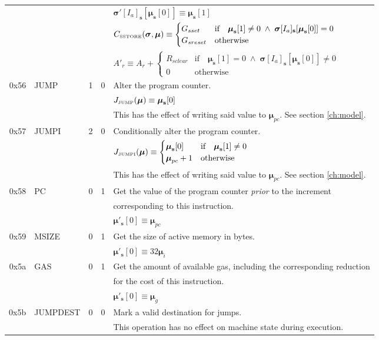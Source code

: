 \documentclass[9pt,oneside]{amsart}
\begin{document}
\begin{tabular*}{\columnwidth}[h]{rlrrl}
&&&& $\boldsymbol{\sigma}'[I_a]_\mathbf{s}[ \boldsymbol{\mu}_\mathbf{s}[0] ] \equiv \boldsymbol{\mu}_\mathbf{s}[1] $ \\
&&&& $C_{\text{\tiny SSTORE}}(\boldsymbol{\sigma}, \boldsymbol{\mu}) \equiv \begin{cases}
G_{sset} & \text{if} \quad \boldsymbol{\mu}_\mathbf{s}[1] \neq 0 \; \wedge \; \boldsymbol{\sigma}[I_a]_\mathbf{s}[\boldsymbol{\mu}_\mathbf{s}[0]] = 0 \\
G_{sreset} & \text{otherwise}
\end{cases}$ \\
&&&& $A'_{r} \equiv A_{r} + \begin{cases}
R_{sclear} & \text{if} \quad \boldsymbol{\mu}_\mathbf{s}[1] = 0 \; \wedge \; \boldsymbol{\sigma}[I_a]_\mathbf{s}[\boldsymbol{\mu}_\mathbf{s}[0]] \neq 0 \\
0 & \text{otherwise}
\end{cases}$ \\
\midrule
0x56 & {\small JUMP} & 1 & 0 & Alter the program counter. \\
&&&& $J_{\text{\tiny JUMP}}(\boldsymbol{\mu}) \equiv \boldsymbol{\mu}_\mathbf{s}[0] $ \\
&&&& This has the effect of writing said value to $\boldsymbol{\mu}_{pc}$. See section \ref{ch:model}. \\
\midrule
0x57 & {\small JUMPI} & 2 & 0 & Conditionally alter the program counter. \\
&&&& $J_{\text{\tiny JUMPI}}(\boldsymbol{\mu}) \equiv \begin{cases} \boldsymbol{\mu}_\mathbf{s}[0] & \text{if} \quad \boldsymbol{\mu}_\mathbf{s}[1] \neq 0 \\ \boldsymbol{\mu}_{pc} + 1 & \text{otherwise} \end{cases} $ \\
&&&& This has the effect of writing said value to $\boldsymbol{\mu}_{pc}$. See section \ref{ch:model}. \\
\midrule
0x58 & {\small PC} & 0 & 1 & Get the value of the program counter \textit{prior} to the increment \\
&&&&  corresponding to this instruction. \\
&&&& $\boldsymbol{\mu}'_\mathbf{s}[0] \equiv \boldsymbol{\mu}_{pc}$ \\
\midrule
0x59 & {\small MSIZE} & 0 & 1 & Get the size of active memory in bytes. \\
&&&& $\boldsymbol{\mu}'_\mathbf{s}[0] \equiv 32\boldsymbol{\mu}_{i}$ \\
\midrule
0x5a & {\small GAS} & 0 & 1 & Get the amount of available gas, including the corresponding reduction \\
&&&& for the cost of this instruction. \\
&&&& $\boldsymbol{\mu}'_\mathbf{s}[0] \equiv \boldsymbol{\mu}_{g}$ \\
\midrule
0x5b & {\small JUMPDEST} & 0 & 0 & Mark a valid destination for jumps. \\
&&&& This operation has no effect on machine state during execution. \\
\bottomrule
\end{tabular*}
\end{document}
